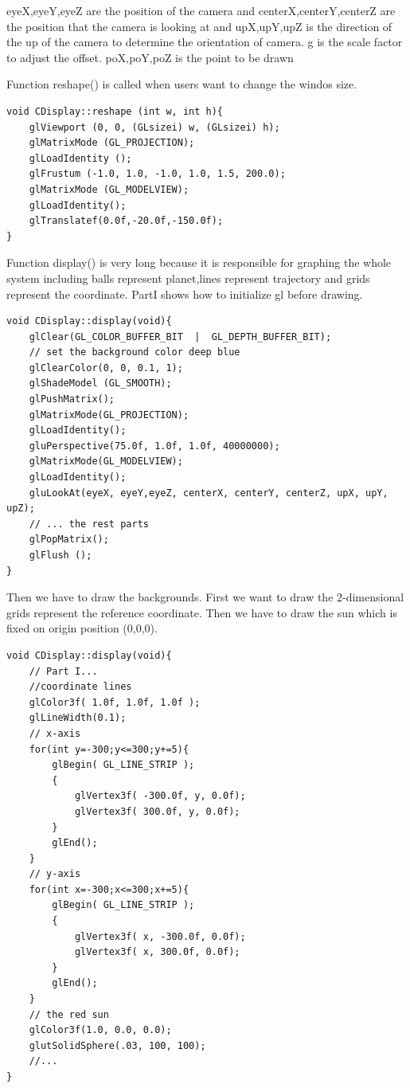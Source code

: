 \documentclass[12pt]{article}
\begin{document}
eyeX,eyeY,eyeZ are the position of the camera
 and centerX,centerY,centerZ are the position that the camera is looking at
 and upX,upY,upZ is the direction of the up of the camera to determine the orientation of camera.
 g is the scale factor to adjust the offset.
 poX,poY,poZ is the point to be drawn

Function reshape() is called when users want to change the windos size.
\begin{lstlisting}[caption=reshape()]
void CDisplay::reshape (int w, int h){
    glViewport (0, 0, (GLsizei) w, (GLsizei) h);
    glMatrixMode (GL_PROJECTION);
    glLoadIdentity ();
    glFrustum (-1.0, 1.0, -1.0, 1.0, 1.5, 200.0);
    glMatrixMode (GL_MODELVIEW);
    glLoadIdentity();
    glTranslatef(0.0f,-20.0f,-150.0f);
}
\end{lstlisting}

Function display() is very long because it is responsible for graphing the whole system
including balls represent planet,lines represent trajectory and grids represent the coordinate.
PartI shows how to initialize gl before drawing.
\begin{lstlisting}[caption=display() PartI Set up the graph ]
void CDisplay::display(void){
    glClear(GL_COLOR_BUFFER_BIT  |  GL_DEPTH_BUFFER_BIT);
    // set the background color deep blue
    glClearColor(0, 0, 0.1, 1);
    glShadeModel (GL_SMOOTH);
    glPushMatrix();
    glMatrixMode(GL_PROJECTION);
    glLoadIdentity();
    gluPerspective(75.0f, 1.0f, 1.0f, 40000000);
    glMatrixMode(GL_MODELVIEW);
    glLoadIdentity();
    gluLookAt(eyeX, eyeY,eyeZ, centerX, centerY, centerZ, upX, upY, upZ);
    // ... the rest parts
    glPopMatrix();
    glFlush ();
}
\end{lstlisting}
\clearpage

Then we have to draw the backgrounds.
First we want to draw the 2-dimensional grids represent the reference coordinate.
Then we have to draw the sun which is fixed on origin position (0,0,0).
\begin{lstlisting}[caption=display() PartII drawing background]
void CDisplay::display(void){
    // Part I...
    //coordinate lines
    glColor3f( 1.0f, 1.0f, 1.0f );
    glLineWidth(0.1);
    // x-axis
    for(int y=-300;y<=300;y+=5){
        glBegin( GL_LINE_STRIP );
        {
            glVertex3f( -300.0f, y, 0.0f);
            glVertex3f( 300.0f, y, 0.0f);
        }
        glEnd();
    }
    // y-axis
    for(int x=-300;x<=300;x+=5){
        glBegin( GL_LINE_STRIP );
        {
            glVertex3f( x, -300.0f, 0.0f);
            glVertex3f( x, 300.0f, 0.0f);
        }
        glEnd();
    }
    // the red sun
    glColor3f(1.0, 0.0, 0.0);
    glutSolidSphere(.03, 100, 100);
    //...
}
\end{lstlisting}
\end{document}
